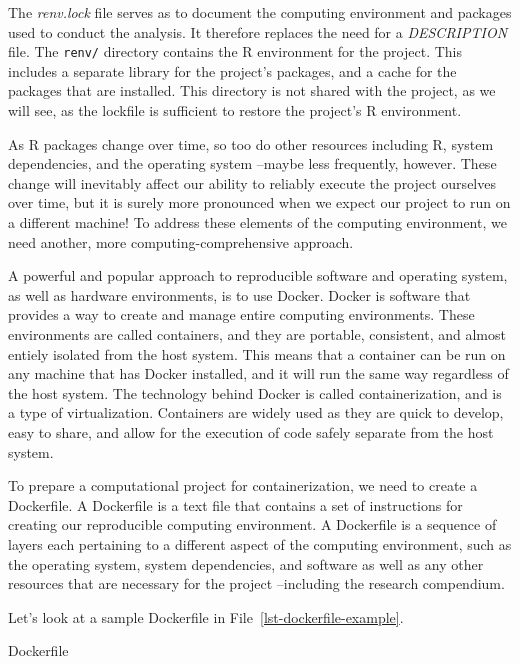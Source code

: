 \documentclass[
  letterpaper,
]{latex/krantz}
\theoremstyle{definition}
\theoremstyle{remark}
\begin{document}
The \emph{renv.lock} file serves as to document the computing
environment and packages used to conduct the analysis. It therefore
replaces the need for a \emph{DESCRIPTION} file. The \texttt{renv/}
directory contains the R environment for the project. This includes a
separate library for the project's packages, and a cache for the
packages that are installed. This directory is not shared with the
project, as we will see, as the lockfile is sufficient to restore the
project's R environment.

As R packages change over time, so too do other resources including R,
system dependencies, and the operating system --maybe less frequently,
however. These change will inevitably affect our ability to reliably
execute the project ourselves over time, but it is surely more
pronounced when we expect our project to run on a different machine! To
address these elements of the computing environment, we need another,
more computing-comprehensive approach.

A powerful and popular approach to reproducible software and operating
system, as well as hardware environments, is to use Docker. Docker is
software that provides a way to create and manage entire computing
environments. These environments are called containers, and they are
portable, consistent, and almost entiely isolated from the host system.
This means that a container can be run on any machine that has Docker
installed, and it will run the same way regardless of the host system.
The technology behind Docker is called containerization, and is a type
of virtualization. Containers are widely used as they are quick to
develop, easy to share, and allow for the execution of code safely
separate from the host system.

To prepare a computational project for containerization, we need to
create a Dockerfile. A Dockerfile is a text file that contains a set of
instructions for creating our reproducible computing environment. A
Dockerfile is a sequence of layers each pertaining to a different aspect
of the computing environment, such as the operating system, system
dependencies, and software as well as any other resources that are
necessary for the project --including the research compendium.

Let's look at a sample Dockerfile in File~\ref{lst-dockerfile-example}.

\begin{codelisting}

\caption{\label{lst-dockerfile-example}Dockerfile}


\end{codelisting}%
\end{document}
